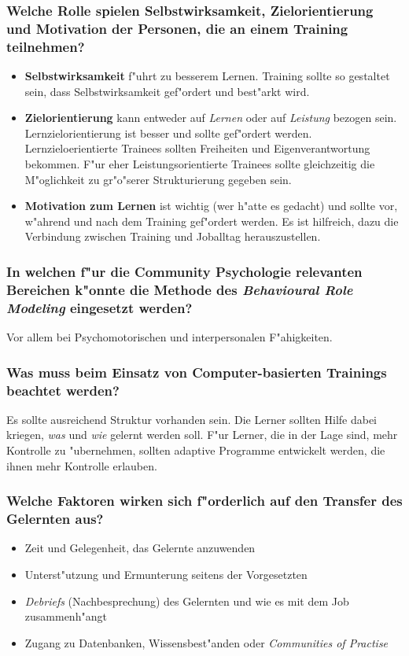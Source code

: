 \subsubsection{Welche Rolle spielen Selbstwirksamkeit, Zielorientierung und Motivation der Personen, die an einem Training teilnehmen?}
\begin{itemize}
        \item \textbf{Selbstwirksamkeit} f"uhrt zu besserem Lernen. Training sollte so gestaltet sein, dass Selbstwirksamkeit gef"ordert und best"arkt wird. 
        \item \textbf{Zielorientierung} kann entweder auf \emph{Lernen} oder auf \emph{Leistung} bezogen sein. Lernzielorientierung ist besser und sollte gef"ordert werden. Lernzieloerientierte Trainees sollten Freiheiten und Eigenverantwortung bekommen. F"ur eher Leistungsorientierte Trainees sollte gleichzeitig die M"oglichkeit zu gr"o"serer Strukturierung gegeben sein.
        \item \textbf{Motivation zum Lernen} ist wichtig (wer h"atte es gedacht) und sollte vor, w"ahrend und nach dem Training gef"ordert werden. Es ist hilfreich, dazu die Verbindung zwischen Training und Joballtag herauszustellen. 
\end{itemize}

\subsubsection{In welchen f"ur die Community Psychologie relevanten Bereichen k"onnte die Methode des \emph{Behavioural Role Modeling} eingesetzt werden?}
Vor allem bei Psychomotorischen und interpersonalen F"ahigkeiten.

\subsubsection{Was muss beim Einsatz von Computer-basierten Trainings beachtet werden?}
Es sollte ausreichend Struktur vorhanden sein. Die Lerner sollten Hilfe dabei kriegen, \emph{was} und \emph{wie} gelernt werden soll. F"ur Lerner, die in der Lage sind, mehr Kontrolle zu "ubernehmen, sollten adaptive Programme entwickelt werden, die ihnen mehr Kontrolle erlauben.

\subsubsection{Welche Faktoren wirken sich f"orderlich auf den Transfer des Gelernten aus?}
\begin{itemize}
        \item Zeit und Gelegenheit, das Gelernte anzuwenden
        \item Unterst"utzung und Ermunterung seitens der Vorgesetzten
        \item \emph{Debriefs} (Nachbesprechung) des Gelernten und wie es mit dem Job zusammenh"angt
        \item Zugang zu Datenbanken, Wissensbest"anden oder \emph{Communities of Practise}
\end{itemize}

